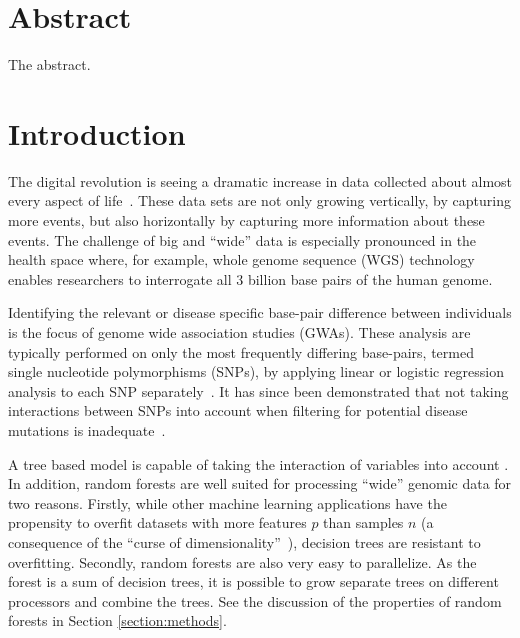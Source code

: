 \documentclass[10pt,letterpaper]{article}
\begin{document}
\clearpage

\section{Abstract}
The abstract.

\linenumbers

\section{Introduction}
The digital revolution is seeing a dramatic increase in data collected about almost every aspect of
life~\cite{Loebbecke2015}.  These data sets are not only growing vertically, by capturing more events, but also
horizontally by capturing more information about these events.  The challenge of big and ``wide'' data is especially
pronounced in the health space where, for example, whole genome sequence (WGS) technology enables researchers to
interrogate all 3 billion base pairs of the human genome.

Identifying the relevant or disease specific base-pair difference between individuals is the focus of genome wide
association studies (GWAs).  These analysis are typically performed on only the most frequently differing base-pairs,
termed single nucleotide polymorphisms (SNPs), by applying linear or logistic regression analysis to each SNP
separately~\cite{CCC2007}.  It has since been demonstrated that not taking interactions between SNPs into account
when filtering for potential disease mutations is inadequate~\cite{Manolio2009,Yang2011}.

A tree based model is capable of taking the interaction of variables into account \cite{Wright.et.al.2016}. In addition, random forests are well
suited for processing ``wide'' genomic data for two reasons.  Firstly, while other machine learning applications have
the propensity to overfit datasets with more features $p$ than samples $n$ (a consequence of the ``curse of
dimensionality''~\cite{Bauer2014, bellman1961adaptive}), decision trees are resistant to overfitting.  Secondly, random
forests are also very easy to parallelize. As the forest is a sum of decision trees, it is possible to grow separate
trees on different processors and combine the trees. See the discussion of the properties of random forests in Section
\ref{section:methods}.
\end{document}
